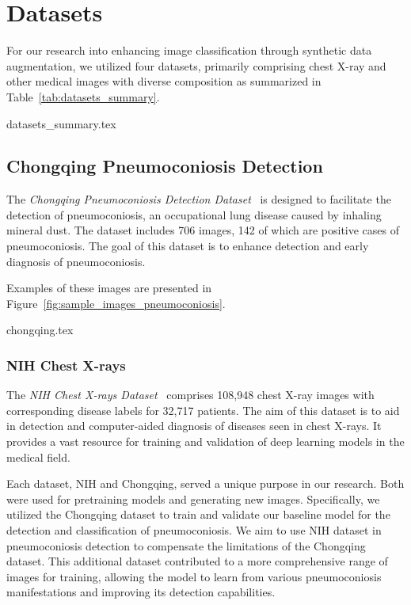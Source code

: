 \chapter{Datasets}

For our research into enhancing image classification through synthetic data augmentation, we utilized four datasets, primarily comprising chest X-ray and other medical images with diverse composition as summarized in Table~\ref{tab:datasets_summary}.

{datasets_summary.tex}

\section{Chongqing Pneumoconiosis Detection}

The \textit{Chongqing Pneumoconiosis Detection Dataset}~\cite{neumoconiosis_paper} is designed to facilitate the detection of pneumoconiosis, an occupational lung disease caused by inhaling mineral dust. The dataset includes 706 images, 142 of which are positive cases of pneumoconiosis. The goal of this dataset is to enhance detection and early diagnosis of pneumoconiosis. 

Examples of these images are presented in Figure~\ref{fig:sample_images_pneumoconiosis}.

{chongqing.tex}

\subsection{NIH Chest X-rays}

The \textit{NIH Chest X-rays Dataset}~\cite{nih_chest_xrays_paper} comprises 108,948 chest X-ray images with corresponding disease labels for 32,717 patients. The aim of this dataset is to aid in detection and computer-aided diagnosis of diseases seen in chest X-rays. It provides a vast resource for training and validation of deep learning models in the medical field.

Each dataset, NIH and Chongqing, served a unique purpose in our research. Both were used for pretraining models and generating new images. Specifically, we utilized the Chongqing dataset to train and validate our baseline model for the detection and classification of pneumoconiosis. We aim to use NIH dataset in pneumoconiosis detection to compensate the limitations of the Chongqing dataset. This additional dataset contributed to a more comprehensive range of images for training, allowing the model to learn from various pneumoconiosis manifestations and improving its detection capabilities.

